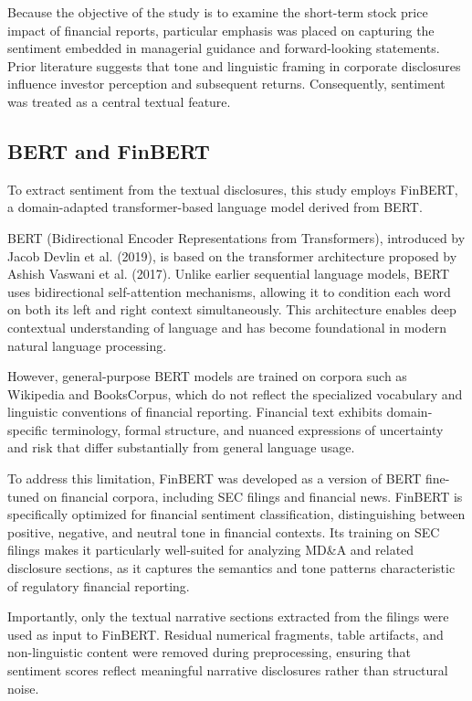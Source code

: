 Because the objective of the study is to examine the short-term stock price impact of financial reports, particular emphasis was placed on capturing the sentiment embedded in managerial guidance and forward-looking statements. 
Prior literature suggests that tone and linguistic framing in corporate disclosures influence investor perception and subsequent returns. 
Consequently, sentiment was treated as a central textual feature.

\subsection*{BERT and FinBERT}

To extract sentiment from the textual disclosures, this study employs FinBERT\cite{yang2020finbert}, a domain-adapted transformer-based language model derived from BERT.

BERT (Bidirectional Encoder Representations from Transformers), introduced by Jacob Devlin et al. (2019)\cite{devlin2019bertpretrainingdeepbidirectional}, is based on the transformer architecture proposed by Ashish Vaswani et al. (2017)\cite{vaswani2017attention}. 
Unlike earlier sequential language models, BERT uses bidirectional self-attention mechanisms, allowing it to condition each word on both its left and right context simultaneously. 
This architecture enables deep contextual understanding of language and has become foundational in modern natural language processing.

However, general-purpose BERT models are trained on corpora such as Wikipedia and BooksCorpus, which do not reflect the specialized vocabulary and linguistic conventions of financial reporting. 
Financial text exhibits domain-specific terminology, formal structure, and nuanced expressions of uncertainty and risk that differ substantially from general language usage.

To address this limitation, FinBERT was developed as a version of BERT fine-tuned on financial corpora, including SEC filings and financial news. 
FinBERT is specifically optimized for financial sentiment classification, distinguishing between positive, negative, and neutral tone in financial contexts. 
Its training on SEC filings makes it particularly well-suited for analyzing MD\&A and related disclosure sections, as it captures the semantics and tone patterns characteristic of regulatory financial reporting.

Importantly, only the textual narrative sections extracted from the filings were used as input to FinBERT. 
Residual numerical fragments, table artifacts, and non-linguistic content were removed during preprocessing, ensuring that sentiment scores reflect meaningful narrative disclosures rather than structural noise.

